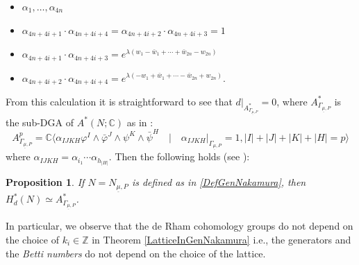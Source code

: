 \documentclass[a4paper, 11pt]{amsart}
\theoremstyle{plain}
\newtheorem{proposizione}{Proposition} [section]
\theoremstyle{definition}
\newcommand{\C}{\mathbb{C}}
\numberwithin{equation}{section}
\begin{document}
\begin{itemize}
    \item $\alpha_{1}, \ldots,\alpha_{4n}$\\[1pt]
    \item $\alpha_{4n+4i+1}\cdot\alpha_{4n+4i+4} = \alpha_{4n+4i+2}\cdot\alpha_{4n+4i+3} = 1$\\[1pt]
    \item $\alpha_{4n+4i+1}\cdot\alpha_{4n+4i+3} = e^{\lambda(w_{1} -\bar w_{1} + \cdots + \bar w_{2n} - w_{2n})}$\\[1pt]
    \item $\alpha_{4n+4i+2}\cdot\alpha_{4n+4i+4} = e^{\lambda(-w_{1} +\bar w_{1} + \cdots  -\bar w_{2n} + w_{2n})}.$
\end{itemize}
From this calculation it is straightforward to see that $d|_{A^{*}_{\Gamma_{\underline{\mu}, P} }} = 0$, where $A^{*}_{\Gamma_{\underline{\mu}, P} }$ is the sub-DGA of $A^{*}(N; \C)$ as in \cite[lemma 2.6]{Kasuya2}:
\[A^{p}_{\Gamma_{\underline{\mu}, P} } = \C \langle \alpha_{IJKH} \varphi^{I} \wedge \bar\varphi^{J} \wedge \psi^{K} \wedge \bar \psi^{H} \quad | \quad \alpha_{IJKH}|_{\Gamma_{\underline{\mu}, P} } = 1, |I| + |J| + |K| + |H| = p \rangle\]
where $\alpha_{IJKH} = \alpha_{i_{1}}\cdots\alpha_{h_{|H|}}$.
Then the following holds (see \cite[theorem 2.7]{Kasuya2}):
\begin{proposizione}\label{GeneratoriDeRhamGenNakamura}
    If $N = N_{\underline{\mu}, P}$ is defined as in \eqref{DefGenNakamura}, then $H^{*}_{d}(N) \simeq A^{*}_{\Gamma_{\underline{\mu}, P} }$.
\end{proposizione}
In particular, we observe that the de Rham cohomology groups do not depend on the choice of $k_{i} \in \mathbb{Z}$ in Theorem \ref{LatticeInGenNakamura} i.e., the generators and the \textit{Betti numbers} do not depend on the choice of the lattice.\\[5pt]
\end{document}
